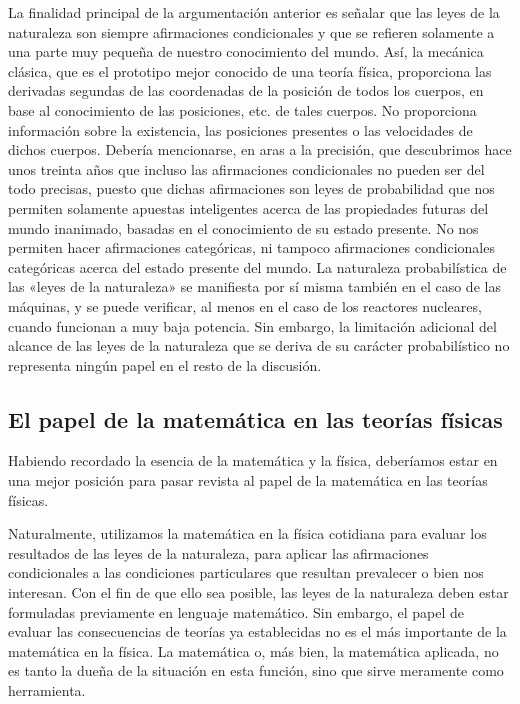 \documentclass[a4paper, 12pt]{article}
\begin{document}
La finalidad principal de la argumentación anterior es señalar que las leyes de la naturaleza son siempre afirmaciones condicionales y que se refieren solamente a una parte muy pequeña de nuestro conocimiento del mundo. Así, la mecánica clásica, que es el prototipo mejor conocido de una teoría física, proporciona las derivadas segundas de las coordenadas de la posición de todos los cuerpos, en base al conocimiento de las posiciones, etc. de tales cuerpos. No proporciona información sobre la existencia, las posiciones presentes o las velocidades de dichos cuerpos. Debería mencionarse, en aras a la precisión, que descubrimos hace unos treinta años que incluso las afirmaciones condicionales no pueden ser del todo precisas, puesto que dichas afirmaciones son leyes de probabilidad que nos permiten solamente apuestas inteligentes acerca de las propiedades futuras del mundo inanimado, basadas en el conocimiento de su estado presente. No nos permiten hacer afirmaciones categóricas, ni tampoco afirmaciones condicionales categóricas acerca del estado presente del mundo. La naturaleza probabilística de las «leyes de la naturaleza» se manifiesta por sí misma también en el caso de las máquinas, y se puede verificar, al menos en el caso de los reactores nucleares, cuando funcionan a muy baja potencia. Sin embargo, la limitación adicional del alcance de las leyes de la naturaleza que se deriva de su carácter probabilístico no representa ningún papel en el resto de la discusión.

\subsection*{El papel de la matemática en las teorías físicas}

Habiendo recordado la esencia de la matemática y la física, deberíamos estar en una mejor posición para pasar revista al papel de la matemática en las teorías físicas.

Naturalmente, utilizamos la matemática en la física cotidiana para evaluar los resultados de las leyes de la naturaleza, para aplicar las afirmaciones condicionales a las condiciones particulares que resultan prevalecer o bien nos interesan. Con el fin de que ello sea posible, las leyes de la naturaleza deben estar formuladas previamente en lenguaje matemático. Sin embargo, el papel de evaluar las consecuencias de teorías ya establecidas no es el más importante de la matemática en la física. La matemática o, más bien, la matemática aplicada, no es tanto la dueña de la situación en esta función, sino que sirve meramente como herramienta.
\end{document}
